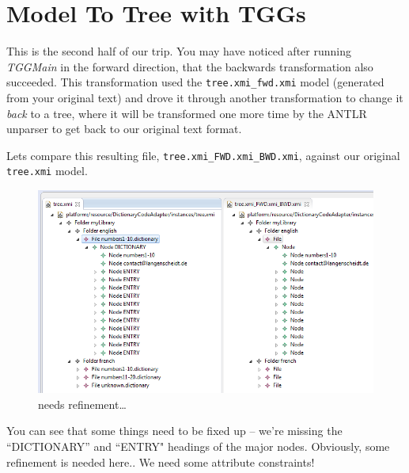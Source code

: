 \newpage
\section{Model To Tree with TGGs}

This is the second half of our trip. You may have noticed after running \emph{TGGMain} in the forward direction, that the backwards transformation also
succeeded. This transformation used the \texttt{tree.xmi\_fwd.xmi} model (generated from your original text) and drove it through another transformation to
change it \emph{back} to a tree, where it will be transformed one more time by the ANTLR unparser to get back to our original text format.

Lets compare this resulting file, \texttt{tree.xmi\_FWD.xmi\_BWD.xmi}, against our original \texttt{tree.xmi} model.

\begin{figure}[htp]
\begin{center}
  \includegraphics[width=\textwidth]{eclipse_generatedBackwardsModel}
  \caption{needs refinement\ldots}
  \label{eclipse:generatedBkwrdMdl}
\end{center}
\end{figure}

You can see that some things need to be fixed up -- we're missing the ``DICTIONARY'' and ``ENTRY" headings of the major nodes. Obviously, some refinement is
needed here.. We need some attribute constraints!





